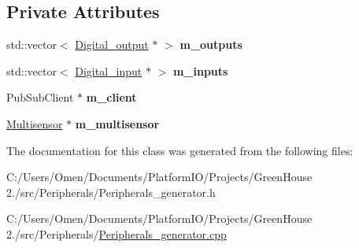 \subsection*{Private Attributes}
\begin{DoxyCompactItemize}
\item 
\mbox{\label{class_peripherals_1_1_peripherals__generator_ad6a8cbcaeba8fd4bbb13dfb7f4443e03}} 
std\+::vector$<$ \hyperlink{class_peripherals_1_1_digital__output}{Digital\+\_\+output} $\ast$ $>$ {\bfseries m\+\_\+outputs}
\item 
\mbox{\label{class_peripherals_1_1_peripherals__generator_af8b7f9c778326b96c8fc453c7eaed431}} 
std\+::vector$<$ \hyperlink{class_peripherals_1_1_digital__input}{Digital\+\_\+input} $\ast$ $>$ {\bfseries m\+\_\+inputs}
\item 
\mbox{\label{class_peripherals_1_1_peripherals__generator_a13b26efb67f8201f94318a31aba302f0}} 
Pub\+Sub\+Client $\ast$ {\bfseries m\+\_\+client}
\item 
\mbox{\label{class_peripherals_1_1_peripherals__generator_a6012609e99b46a41c65c64d89e9ffbc6}} 
\hyperlink{class_peripherals_1_1_multisensor}{Multisensor} $\ast$ {\bfseries m\+\_\+multisensor}
\end{DoxyCompactItemize}


The documentation for this class was generated from the following files\+:\begin{DoxyCompactItemize}
\item 
C\+:/\+Users/\+Omen/\+Documents/\+Platform\+I\+O/\+Projects/\+Green\+House 2./src/\+Peripherals/Peripherals\+\_\+generator.\+h\item 
C\+:/\+Users/\+Omen/\+Documents/\+Platform\+I\+O/\+Projects/\+Green\+House 2./src/\+Peripherals/\hyperlink{_peripherals__generator_8cpp}{Peripherals\+\_\+generator.\+cpp}\end{DoxyCompactItemize}
